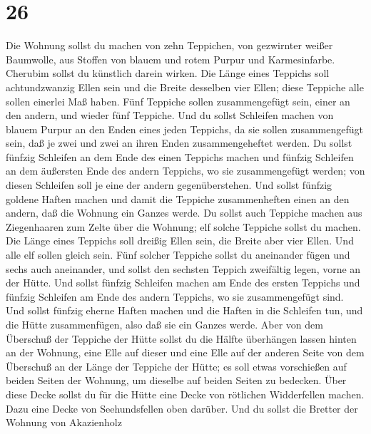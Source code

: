 \hypertarget{section-25}{%
\section{26}\label{section-25}}

 Die Wohnung sollst du machen von zehn Teppichen, von
gezwirnter weißer Baumwolle, aus Stoffen von blauem und rotem Purpur und
Karmesinfarbe. Cherubim sollst du künstlich darein wirken.
 Die Länge eines Teppichs soll achtundzwanzig Ellen sein
und die Breite desselben vier Ellen; diese Teppiche alle sollen einerlei
Maß haben.  Fünf Teppiche sollen zusammengefügt sein,
einer an den andern, und wieder fünf Teppiche.  Und du
sollst Schleifen machen von blauem Purpur an den Enden eines jeden
Teppichs, da sie sollen zusammengefügt sein, daß je zwei und zwei an
ihren Enden zusammengeheftet werden.  Du sollst fünfzig
Schleifen an dem Ende des einen Teppichs machen und fünfzig Schleifen an
dem äußersten Ende des andern Teppichs, wo sie zusammengefügt werden;
von diesen Schleifen soll je eine der andern gegenüberstehen.
 Und sollst fünfzig goldene Haften machen und damit die
Teppiche zusammenheften einen an den andern, daß die Wohnung ein Ganzes
werde.  Du sollst auch Teppiche machen aus Ziegenhaaren
zum Zelte über die Wohnung; elf solche Teppiche sollst du machen.
 Die Länge eines Teppichs soll dreißig Ellen sein, die
Breite aber vier Ellen. Und alle elf sollen gleich sein. 
Fünf solcher Teppiche sollst du aneinander fügen und sechs auch
aneinander, und sollst den sechsten Teppich zweifältig legen, vorne an
der Hütte.  Und sollst fünfzig Schleifen machen am Ende
des ersten Teppichs und fünfzig Schleifen am Ende des andern Teppichs,
wo sie zusammengefügt sind.  Und sollst fünfzig eherne
Haften machen und die Haften in die Schleifen tun, und die Hütte
zusammenfügen, also daß sie ein Ganzes werde.  Aber von
dem Überschuß der Teppiche der Hütte sollst du die Hälfte überhängen
lassen hinten an der Wohnung,  eine Elle auf dieser und
eine Elle auf der anderen Seite von dem Überschuß an der Länge der
Teppiche der Hütte; es soll etwas vorschießen auf beiden Seiten der
Wohnung, um dieselbe auf beiden Seiten zu bedecken.  Über
diese Decke sollst du für die Hütte eine Decke von rötlichen
Widderfellen machen. Dazu eine Decke von Seehundsfellen oben darüber.
 Und du sollst die Bretter der Wohnung von Akazienholz
